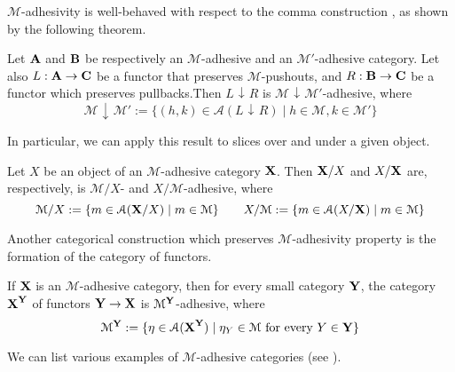 \documentclass[a4paper,UKenglish,cleveref,pdftex, thm-restate,numberwithinsect]{lipics}
\def\A{\textbf {\textup{A}}}
\def\B{\textbf {\textup{B}}}
\def\C{\textbf {\textup{C}}}
\def\X{\textbf {\textup{X}}}
\def\Y{\textbf {\textup{Y}}}
\newcommand{\comma}[2]{#1\hspace{1pt} {\downarrow}\hspace{1pt} #2}
\newcommand{\cma}[2]{\mathcal{#1}\hspace{1pt} {\downarrow}\hspace{1pt} \mathcal{#2}}
\begin{document}
$\mathcal{M}$-adhesivity is well-behaved with respect to  the comma construction \cite{mac2013categories}, as shown by the following theorem.
\begin{theorem}\label{lem:comma}
	Let $\A$ and $\B$ be respectively an $\mathcal{M}$-adhesive and an $\mathcal{M}'$-adhesive category. Let also $L:\A\rightarrow \C$ be a functor that preserves $\mathcal{M}$-pushouts, and  $R:\B\rightarrow \C$ be a functor which preserves pullbacks.Then $\comma{L}{R}$ is $\cma{M}{M'}$-adhesive, where 
	\[
	\cma{M}{M}':=\{(h,k)\in \mathcal{A}(\comma{L}{R}) \mid h\in \mathcal{M}, k\in \mathcal{M}'\}\]
\end{theorem}

In particular, we can apply this result to slices over and under a given object.

\begin{corollary}\label{cor:slice}
	Let  $X$ be an object of an $\mathcal{M}$-adhesive category $\X$. Then  $\X/X$ and $X/\X$ are, respectively, is $\mathcal{M}/X$- and $X/\mathcal{M}$-adhesive, where
	\[\mathcal{M}/X:=\{m\in  \mathcal{A}(\X/X) \mid m\in \mathcal{M} \} \qquad X/\mathcal{M}:=\{m\in  \mathcal{A}(X/\X) \mid m\in \mathcal{M} \}\]
\end{corollary}


Another categorical construction which preserves $\mathcal{M}$-adhesivity property is the formation of the category of functors.

\begin{theorem}\label{thm:functors}
If $\X$ is an $\mathcal{M}$-adhesive category, then for every small category $\Y$, the category $\X^\Y$  of functors $\Y\to \X$ is $\mathcal{M}^{\Y}$-adhesive, where
\[\mathcal{M}^{\Y}:=\{\eta \in \mathcal{A}(\X^\Y) \mid \eta_Y \in \mathcal{M} \text{ for every } Y\in \Y\}\]
\end{theorem}

We can list various examples of $\mathcal{M}$-adhesive categories (see \cite{castelnovo2023thesis,CastelnovoGM22,lack2006toposes}).

\begin{example}
\end{example}

\begin{example}
\end{example}


\begin{example}
\end{example}
\end{document}
